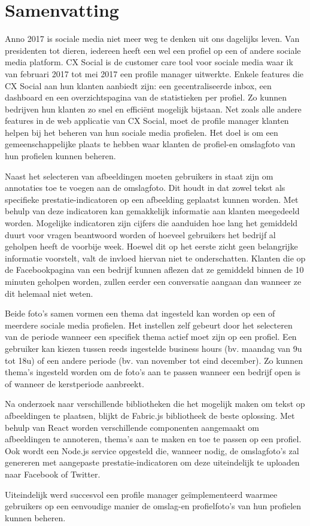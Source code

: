 \chapter{Samenvatting}
\vspace{-3cm}
Anno 2017 is sociale media niet meer weg te denken uit ons dagelijks leven. Van presidenten tot dieren, iedereen heeft een wel een profiel op een of andere sociale media platform. CX Social is de customer care tool voor sociale media waar ik van februari 2017 tot mei 2017 een profile manager uitwerkte. Enkele features die CX Social aan hun klanten aanbiedt zijn: een gecentraliseerde inbox,  een dashboard en een overzichtspagina van de statistieken per profiel. Zo kunnen bedrijven hun klanten zo snel en effici\"{e}nt mogelijk bijstaan. Net zoals alle andere features in de web applicatie van CX Social, moet de profile manager klanten helpen bij het beheren van hun sociale media profielen. Het doel is om een gemeenschappelijke plaats te hebben waar klanten de profiel-en omslagfoto van hun profielen kunnen beheren.

Naast het selecteren van afbeeldingen moeten gebruikers in staat zijn om annotaties toe te voegen aan de omslagfoto. Dit houdt in dat zowel tekst als specifieke prestatie-indicatoren op een afbeelding geplaatst kunnen worden. Met behulp van deze indicatoren kan gemakkelijk informatie aan klanten meegedeeld worden. Mogelijke indicatoren zijn cijfers die aanduiden hoe lang het gemiddeld duurt voor vragen beantwoord worden of hoeveel gebruikers het bedrijf al geholpen heeft de voorbije week. Hoewel dit op het eerste zicht geen belangrijke informatie voorstelt, valt de invloed hiervan niet te onderschatten. Klanten die op de Facebookpagina van een bedrijf kunnen aflezen dat ze gemiddeld binnen de 10 minuten geholpen worden, zullen eerder een conversatie aangaan dan wanneer ze dit helemaal niet weten.

Beide foto's samen vormen een thema dat ingesteld kan worden op een of meerdere sociale media profielen. Het instellen zelf gebeurt door het selecteren van de periode wanneer een specifiek thema actief moet zijn op een profiel. Een gebruiker kan kiezen tussen reeds ingestelde business hours (bv. maandag van 9u tot 18u) of een andere periode (bv. van november tot eind december). Zo kunnen thema's ingesteld worden om de foto's aan te passen wanneer een bedrijf open is of wanneer de kerstperiode aanbreekt. 

Na onderzoek naar verschillende bibliotheken die het mogelijk maken om tekst op afbeeldingen te plaatsen, blijkt de Fabric.js bibliotheek de beste oplossing. Met behulp van React worden verschillende componenten aangemaakt om afbeeldingen te annoteren, thema's aan te maken en toe te passen op een profiel. Ook wordt een Node.js service opgesteld die, wanneer nodig, de omslagfoto's zal genereren met aangepaste prestatie-indicatoren om deze uiteindelijk te uploaden naar Facebook of Twitter. 

Uiteindelijk werd succesvol een profile manager ge\"{i}mplementeerd waarmee gebruikers op een eenvoudige manier de omslag-en profielfoto's van hun profielen kunnen beheren. 
